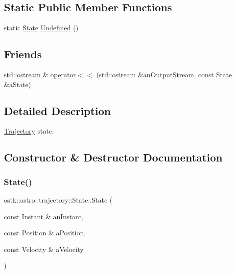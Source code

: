 \subsection*{Static Public Member Functions}
\begin{DoxyCompactItemize}
\item 
static \hyperlink{classostk_1_1astro_1_1trajectory_1_1_state}{State} \hyperlink{classostk_1_1astro_1_1trajectory_1_1_state_ab6ed6a252eeac1d24cf3b5c65ec0c6b6}{Undefined} ()
\end{DoxyCompactItemize}
\subsection*{Friends}
\begin{DoxyCompactItemize}
\item 
std\+::ostream \& \hyperlink{classostk_1_1astro_1_1trajectory_1_1_state_abba03f039f2534d691a1dc28426e8b89}{operator$<$$<$} (std\+::ostream \&an\+Output\+Stream, const \hyperlink{classostk_1_1astro_1_1trajectory_1_1_state}{State} \&a\+State)
\end{DoxyCompactItemize}


\subsection{Detailed Description}
\hyperlink{classostk_1_1astro_1_1_trajectory}{Trajectory} state. 

\subsection{Constructor \& Destructor Documentation}
\mbox{\label{classostk_1_1astro_1_1trajectory_1_1_state_a8628aceae903c9492f0fb269888434b0}} 
\subsubsection{\texorpdfstring{State()}{State()}}
{\footnotesize\ttfamily ostk\+::astro\+::trajectory\+::\+State\+::\+State (\begin{DoxyParamCaption}\item[{const Instant \&}]{an\+Instant,  }\item[{const Position \&}]{a\+Position,  }\item[{const Velocity \&}]{a\+Velocity }\end{DoxyParamCaption})}



